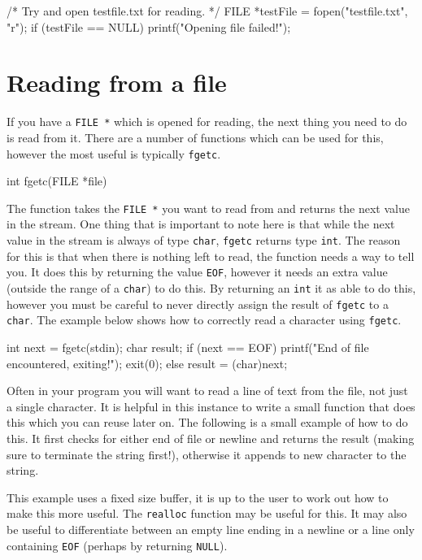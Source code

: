 \begin{codeblock}
/* Try and open testfile.txt for reading. */ 
FILE *testFile = fopen("testfile.txt", "r");
if (testFile == NULL) {
    printf("Opening file failed!\n");
}
\end{codeblock}

\section{Reading from a file}

If you have a \texttt{FILE *} which is opened for reading, the next thing you need to do is read from it.
There are a number of functions which can be used for this, however the most useful is typically \texttt{fgetc}.

\begin{codeinline}
int fgetc(FILE *file)
\end{codeinline}

The function takes the \texttt{FILE *} you want to read from and returns the next value in the stream.
One thing that is important to note here is that while the next value in the stream is always of type \texttt{char}, \texttt{fgetc} returns type \texttt{int}. 
The reason for this is that when there is nothing left to read, the function needs a way to tell you.
It does this by returning the value \texttt{EOF}, however it needs an extra value (outside the range of a \texttt{char}) to do this.
By returning an \texttt{int} it as able to do this, however you must be careful to never directly assign the result of \texttt{fgetc} to a \texttt{char}.
The example below shows how to correctly read a character using \texttt{fgetc}.

\begin{codeblock}
int next = fgetc(stdin);
char result;
if (next == EOF) {
    printf("End of file encountered, exiting!\n");
    exit(0);
} else {
  result = (char)next;
}
\end{codeblock}

Often in your program you will want to read a line of text from the file, not just a single character.
It is helpful in this instance to write a small function that does this which you can reuse later on.
The following is a small example of how to do this.
It first checks for either end of file or newline and returns the result (making sure to terminate the string first!), otherwise it appends to new character to the string.

This example uses a fixed size buffer, it is up to the user to work out how to make this more useful.
The \texttt{realloc} function may be useful for this.
It may also be useful to differentiate between an empty line ending in a newline or a line only containing \texttt{EOF} (perhaps by returning \texttt{NULL}).

